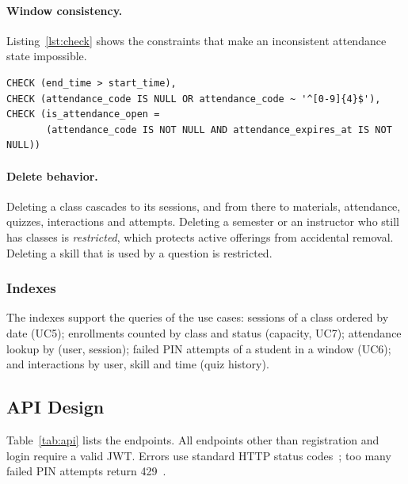 \paragraph{Window consistency.} Listing~\ref{lst:check} shows the constraints that make an inconsistent attendance state impossible.

\begin{lstlisting}[language=SQLpg, caption={Constraints of \texttt{course\_sessions}}, label={lst:check}]
CHECK (end_time > start_time),
CHECK (attendance_code IS NULL OR attendance_code ~ '^[0-9]{4}$'),
CHECK (is_attendance_open =
       (attendance_code IS NOT NULL AND attendance_expires_at IS NOT NULL))
\end{lstlisting}

\paragraph{Delete behavior.} Deleting a class cascades to its sessions, and from there to materials, attendance, quizzes, interactions and attempts. Deleting a semester or an instructor who still has classes is \emph{restricted}, which protects active offerings from accidental removal. Deleting a skill that is used by a question is restricted.

\subsubsection{Indexes}

The indexes support the queries of the use cases: sessions of a class ordered by date (UC5); enrollments counted by class and status (capacity, UC7); attendance lookup by (user, session); failed PIN attempts of a student in a window (UC6); and interactions by user, skill and time (quiz history).

\subsection{API Design}
\label{sec:api}

Table~\ref{tab:api} lists the endpoints. All endpoints other than registration and login require a valid JWT. Errors use standard HTTP status codes~\cite{rfc9110}; too many failed PIN attempts return 429~\cite{rfc6585}.


